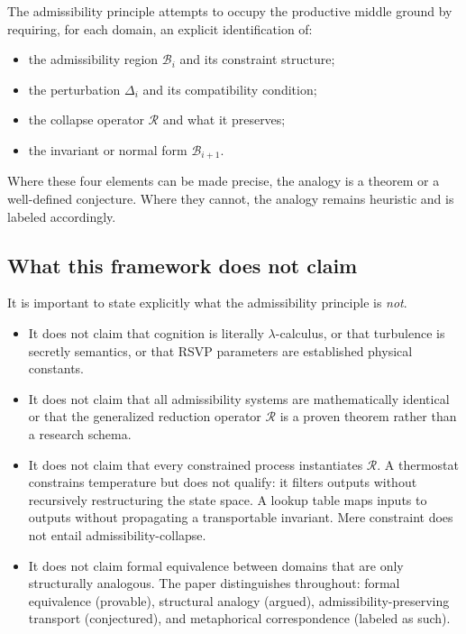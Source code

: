 \documentclass[12pt, a4paper]{article}
\theoremstyle{plain}
\theoremstyle{definition}
\theoremstyle{remark}
\newcommand{\Rcal}{\mathcal{R}}
\newcommand{\Bcal}{\mathcal{B}}
\begin{document}
The admissibility principle attempts to occupy the productive middle ground
by requiring, for each domain, an explicit identification of:
\begin{itemize}
  \item the admissibility region $\Bcal_i$ and its constraint structure;
  \item the perturbation $\Delta_i$ and its compatibility condition;
  \item the collapse operator $\Rcal$ and what it preserves;
  \item the invariant or normal form $\Bcal_{i+1}$.
\end{itemize}
Where these four elements can be made precise, the analogy is a theorem
or a well-defined conjecture.
Where they cannot, the analogy remains heuristic and is labeled accordingly.

\subsection{What this framework does not claim}

It is important to state explicitly what the admissibility principle
is \emph{not}.
\begin{itemize}
  \item It does not claim that cognition is literally $\lambda$-calculus,
        or that turbulence is secretly semantics, or that RSVP parameters
        are established physical constants.
  \item It does not claim that all admissibility systems are
        mathematically identical or that the generalized reduction operator
        $\Rcal$ is a proven theorem rather than a research schema.
  \item It does not claim that every constrained process instantiates
        $\Rcal$.
        A thermostat constrains temperature but does not qualify: it
        filters outputs without recursively restructuring the state space.
        A lookup table maps inputs to outputs without propagating a
        transportable invariant.
        Mere constraint does not entail admissibility-collapse.
  \item It does not claim formal equivalence between domains that are
        only structurally analogous.
        The paper distinguishes throughout: formal equivalence
        (provable), structural analogy (argued), admissibility-preserving
        transport (conjectured), and metaphorical correspondence
        (labeled as such).
\end{itemize}
\end{document}
